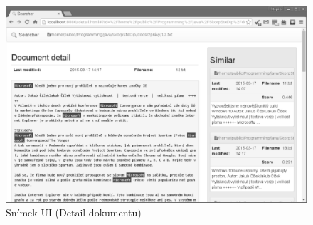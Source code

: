 \begin{figure}[h]
\begin{center}
\includegraphics[width=13cm]{ScreenDetail}
\caption{Snímek UI (Detail dokumentu)}
\label{fig:ScreenDetail}
\end{center}
\end{figure}